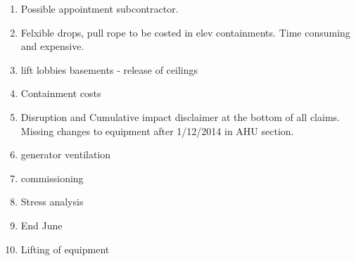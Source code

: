 \begin{enumerate}
\item Possible appointment subcontractor.

\item Felxible drops, pull rope to be costed in elev containments. Time consuming and expensive.

\item lift lobbies basements - release of ceilings

\item Containment costs

\item Disruption and Cumulative impact disclaimer at the bottom of all claims. Missing changes to equipment after 1/12/2014 in AHU section.

\item generator ventilation

\item commissioning

\item Stress analysis
\item End June

\item Lifting of equipment
\end{enumerate}

